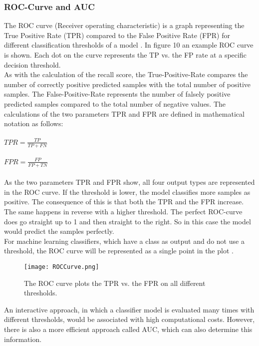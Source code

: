 \documentclass[../masterarbeit.tex]{subfiles}
\begin{document}
\subsubsection{ROC-Curve and AUC}
The ROC curve (Receiver operating characteristic) is a graph representing the True Positive Rate (TPR) compared to the False Positive Rate (FPR) for different classification thresholds of a model \textcite[]{Google_ROC_AUC:2022}. In figure 10 an example ROC curve is shown. Each dot on the curve represents the TP vs. the FP rate at a specific decision threshold.\\
As with the calculation of the recall score, the True-Positive-Rate compares the number of correctly positive predicted samples with the total number of positive samples. The False-Positive-Rate represents the number of falsely positive predicted samples compared to the total number of negative values. 
The calculations of the two parameters TPR and FPR are defined in mathematical notation as follows:
\\~\\
\(TPR = \frac{TP}{TP + FN} \) \hfill \textcite[]{Google_ROC_AUC:2022} \\~\\
\(FPR = \frac{FP}{FP + TN} \) \hfill \textcite[]{Google_ROC_AUC:2022} 
\\~\\
As the two parameters TPR and FPR show, all four output types are represented in the ROC curve.
If the threshold is lower, the model classifies more samples as positive. The consequence of this is that both the TPR and the FPR increase. The same happens in reverse with a higher threshold. The perfect ROC-curve does go straight up to 1 and then straight to the right. So in this case the model would predict the samples perfectly. \autocite[]{Google_ROC_AUC:2022} \autocite[]{Kartik_evaluation:2022} \\
For machine learning classifiers, which have a class as output and do not use a threshold, the ROC curve will be represented as a single point in the plot \textcite[]{analyticsvidhya_evaluation:2022}. \\ 

\begin{figure}[h]
    \centering
    \texttt{[image: ROCCurve.png]}
    \caption{The ROC curve plots the TPR vs. the FPR on all different thresholds.}
\end{figure}
An interactive approach, in which a classifier model is evaluated many times with different thresholds, would be associated with high computational costs. However, there is also a more efficient approach called AUC, which can also determine this information. \autocite[]{Google_ROC_AUC:2022} \\~\\
\end{document}
